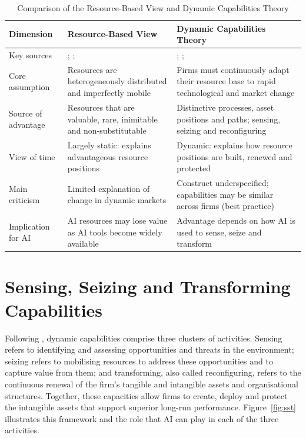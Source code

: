 \begin{table}[H]
  \centering
  \caption{Comparison of the Resource-Based View and Dynamic Capabilities Theory}
  \label{tab:rbv-dc}
  \small{}
  \begin{tabularx}{\textwidth}{>{\raggedright\arraybackslash}p{2.9cm}>{\raggedright\arraybackslash}X>{\raggedright\arraybackslash}X}
    \toprule
    \textbf{Dimension} & \textbf{Resource-Based View} & \textbf{Dynamic Capabilities Theory} \\
    \midrule
    Key sources & \textcite[171]{wernerfelt1984}; \textcite[99]{barney1991}; \textcite[179]{peteraf1993} & \textcite[509]{teece1997}; \textcite[1105]{eisenhardt2000}; \textcite[1319]{teece2007} \\
    \addlinespace
    Core assumption & Resources are heterogeneously distributed and imperfectly mobile & Firms must continuously adapt their resource base to rapid technological and market change \\
    \addlinespace
    Source of advantage & Resources that are valuable, rare, inimitable and non-substitutable & Distinctive processes, asset positions and paths; sensing, seizing and reconfiguring \\
    \addlinespace
    View of time & Largely static: explains advantageous resource positions & Dynamic: explains how resource positions are built, renewed and protected \\
    \addlinespace
    Main criticism & Limited explanation of change in dynamic markets & Construct underspecified; capabilities may be similar across firms (best practice) \\
    \addlinespace
    Implication for AI & AI resources may lose value as AI tools become widely available & Advantage depends on how AI is used to sense, seize and transform \\
    \bottomrule
  \end{tabularx}
\end{table}

\section{Sensing, Seizing and Transforming Capabilities}
\label{sec:sst}

Following \textcite[1319]{teece2007}, dynamic capabilities comprise three clusters of activities. Sensing refers to identifying and assessing opportunities and threats in the environment; seizing refers to mobilising resources to address these opportunities and to capture value from them; and transforming, also called reconfiguring, refers to the continuous renewal of the firm's tangible and intangible assets and organisational structures. Together, these capacities allow firms to create, deploy and protect the intangible assets that support superior long-run performance. Figure~\ref{fig:sst} illustrates this framework and the role that AI can play in each of the three activities.

